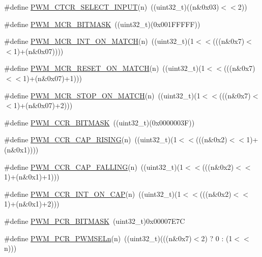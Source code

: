 \begin{DoxyCompactItemize}
\item 
\#define \hyperlink{group___p_w_m___private___macros_ga69efaea16d2bf2307e2920e3604337be}{\-P\-W\-M\-\_\-\-C\-T\-C\-R\-\_\-\-S\-E\-L\-E\-C\-T\-\_\-\-I\-N\-P\-U\-T}(n)~((uint32\-\_\-t)((n\&0x03)$<$$<$2))
\item 
\#define \hyperlink{group___p_w_m___private___macros_gafb46674df2d57b4d204bf2bcd36cb22d}{\-P\-W\-M\-\_\-\-M\-C\-R\-\_\-\-B\-I\-T\-M\-A\-S\-K}~((uint32\-\_\-t)(0x001\-F\-F\-F\-F\-F))
\item 
\#define \hyperlink{group___p_w_m___private___macros_gadfef5b9b5a90562bb806323d9ca13523}{\-P\-W\-M\-\_\-\-M\-C\-R\-\_\-\-I\-N\-T\-\_\-\-O\-N\-\_\-\-M\-A\-T\-C\-H}(n)~((uint32\-\_\-t)(1$<$$<$(((n\&0x7)$<$$<$1)+(n\&0x07))))
\item 
\#define \hyperlink{group___p_w_m___private___macros_ga4fa66badef1968838989982bd1327bce}{\-P\-W\-M\-\_\-\-M\-C\-R\-\_\-\-R\-E\-S\-E\-T\-\_\-\-O\-N\-\_\-\-M\-A\-T\-C\-H}(n)~((uint32\-\_\-t)(1$<$$<$(((n\&0x7)$<$$<$1)+(n\&0x07)+1)))
\item 
\#define \hyperlink{group___p_w_m___private___macros_ga7486f1c4c83ca5b1a5dd74798b3d7836}{\-P\-W\-M\-\_\-\-M\-C\-R\-\_\-\-S\-T\-O\-P\-\_\-\-O\-N\-\_\-\-M\-A\-T\-C\-H}(n)~((uint32\-\_\-t)(1$<$$<$(((n\&0x7)$<$$<$1)+(n\&0x07)+2)))
\item 
\#define \hyperlink{group___p_w_m___private___macros_gab15d8e3967908c23128b19c8d30f0906}{\-P\-W\-M\-\_\-\-C\-C\-R\-\_\-\-B\-I\-T\-M\-A\-S\-K}~((uint32\-\_\-t)(0x0000003\-F))
\item 
\#define \hyperlink{group___p_w_m___private___macros_gad80bfd80b528785c96af610ac8c027b3}{\-P\-W\-M\-\_\-\-C\-C\-R\-\_\-\-C\-A\-P\-\_\-\-R\-I\-S\-I\-N\-G}(n)~((uint32\-\_\-t)(1$<$$<$(((n\&0x2)$<$$<$1)+(n\&0x1))))
\item 
\#define \hyperlink{group___p_w_m___private___macros_ga1ec5d09751bbb8e8f214ef0e04255dd4}{\-P\-W\-M\-\_\-\-C\-C\-R\-\_\-\-C\-A\-P\-\_\-\-F\-A\-L\-L\-I\-N\-G}(n)~((uint32\-\_\-t)(1$<$$<$(((n\&0x2)$<$$<$1)+(n\&0x1)+1)))
\item 
\#define \hyperlink{group___p_w_m___private___macros_ga1e32f37d8c4638ab3cb8d582a7018829}{\-P\-W\-M\-\_\-\-C\-C\-R\-\_\-\-I\-N\-T\-\_\-\-O\-N\-\_\-\-C\-A\-P}(n)~((uint32\-\_\-t)(1$<$$<$(((n\&0x2)$<$$<$1)+(n\&0x1)+2)))
\item 
\#define \hyperlink{group___p_w_m___private___macros_gadcf8e08637293785d18e6fb14f2c064d}{\-P\-W\-M\-\_\-\-P\-C\-R\-\_\-\-B\-I\-T\-M\-A\-S\-K}~(uint32\-\_\-t)0x00007\-E7\-C
\item 
\#define \hyperlink{group___p_w_m___private___macros_gad887b10b3395e0114f20180da78ba246}{\-P\-W\-M\-\_\-\-P\-C\-R\-\_\-\-P\-W\-M\-S\-E\-Ln}(n)~((uint32\-\_\-t)(((n\&0x7)$<$2) ? 0 \-: (1$<$$<$n)))

\end{DoxyCompactItemize}
